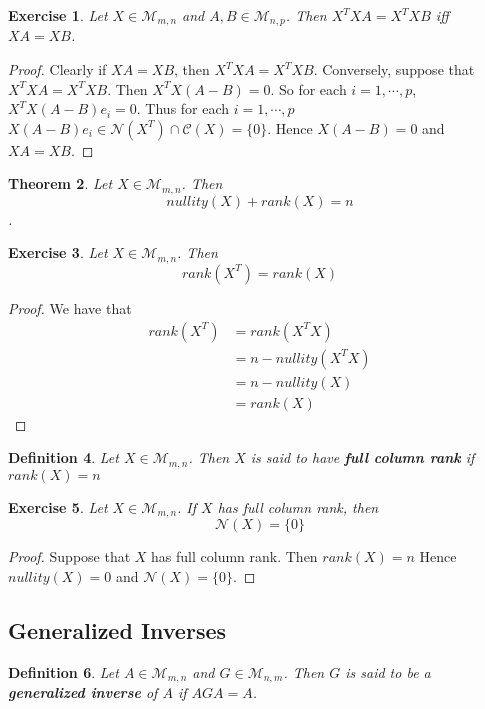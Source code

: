 \documentclass[12pt]{amsart}
\newtheorem{thm}{Theorem}[section]
\newtheorem{defn}[thm]{Definition}
\newtheorem{ex}[thm]{Exercise}
\newcommand{\MC}{\mathcal{C}}
\newcommand{\MN}{\mathcal{N}}
\newcommand{\MM}{\mathcal{M}}
\begin{document}
\begin{ex}
Let $X \in \MM_{m,n}$ and $A,B \in \MM_{n,p}$. Then $X^TXA = X^TXB$ iff $XA = XB$. 
\end{ex}

\begin{proof}
Clearly if $XA = XB$, then $X^TXA = X^TXB$. Conversely, suppose that $X^TXA = X^TXB$. Then $X^TX(A-B) = 0$. So for  each $i =1, \cdots, p$, $X^TX(A-B)e_i = 0$. Thus for each $i=1, \cdots, p$ $X(A-B)e_i \in \MN(X^T) \cap \MC(X) = \{0\}$. Hence $X(A-B) = 0$ and $XA = XB$. 
\end{proof}

\begin{thm}
Let $X \in \MM_{m,n}$. Then $$nullity(X) + rank(X) = n$$.
\end{thm}

\begin{ex} 
Let $X \in \MM_{m,n}$. Then
$$rank(X^T) = rank(X)$$
\end{ex}

\begin{proof}
We have that 
\begin{align*}
rank(X^T)
&= rank(X^TX) \\
&= n - nullity(X^TX) \\
&= n - nullity(X) \\
&= rank(X)
\end{align*}
\end{proof}

\begin{defn}
Let $X \in \MM_{m,n}$. Then $X$ is said to have \textbf{full column rank} if $rank(X) = n$
\end{defn}

\begin{ex}
Let $X \in \MM_{m,n}$. If $X$ has full column rank, then $$\MN(X) = \{0\}$$
\end{ex}

\begin{proof}
Suppose that $X$ has full column rank. Then $rank(X) = n$ Hence $nullity(X) = 0$ and $\MN(X) = \{0\}$.
\end{proof}


\subsection{Generalized Inverses}

\begin{defn}
Let $A \in \MM_{m,n}$ and $G \in \MM_{n,m}$. Then $G$ is said to be a \textbf{generalized inverse} of $A$ if $AGA = A$. 
\end{defn}
\end{document}
